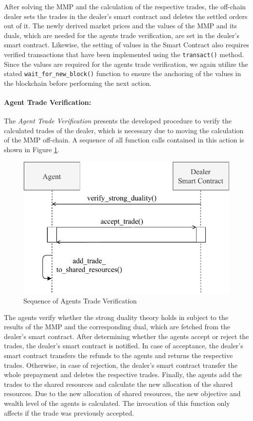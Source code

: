 After solving the MMP and the calculation of the respective 
trades, the off-chain dealer sets the trades in the dealer's smart contract
and deletes the settled orders out of it.
The newly derived market prices and the values of the MMP and its duals, which are needed 
for the agents trade verification, are set in the dealer's smart contract.
Likewise, the setting of values in the Smart Contract also requires verified 
transactions that have been implemented using the \verb|transact()| method. Since the 
values are required for the agents trade verification, we again utilize the stated 
\verb|wait_for_new_block()| function to ensure the anchoring of the values in the blockchain
before performing the next action.

\paragraph{Agent Trade Verification:}
The \textit{Agent Trade Verification} presents the developed procedure to 
verify the calculated trades of the dealer, which is necessary due to moving
the calculation of the MMP off-chain. A sequence of all function calls contained 
in this action is shown in Figure \ref{figure:agents_trade_verification}.

\begin{figure}[htbp]
	\centering
	\includegraphics[width=.8\linewidth]{./figures/trade_verification.pdf}
	\caption{Sequence of Agents Trade Verification}
	\label{figure:agents_trade_verification}
\end{figure}

The agents verify whether the strong duality theory holds in subject 
to the results of the MMP and the corresponding dual, which are 
fetched from the dealer's smart contract. 
After determining whether the agents accept or reject the trades, the dealer's
smart contract is notified.
In case of acceptance, the dealer's smart contract transfers the refunds 
to the agents and returns the respective trades. Otherwise, in case of  
rejection, the dealer's smart contract transfer the whole prepayment 
and deletes the respective trades.
Finally, the agents add the trades to the shared resources and calculate the new allocation
of the shared resources. Due to the new allocation of 
shared resources, the new objective and wealth level of the agents is calculated.
The invocation of this function only affects if the trade was previously accepted. \newline


